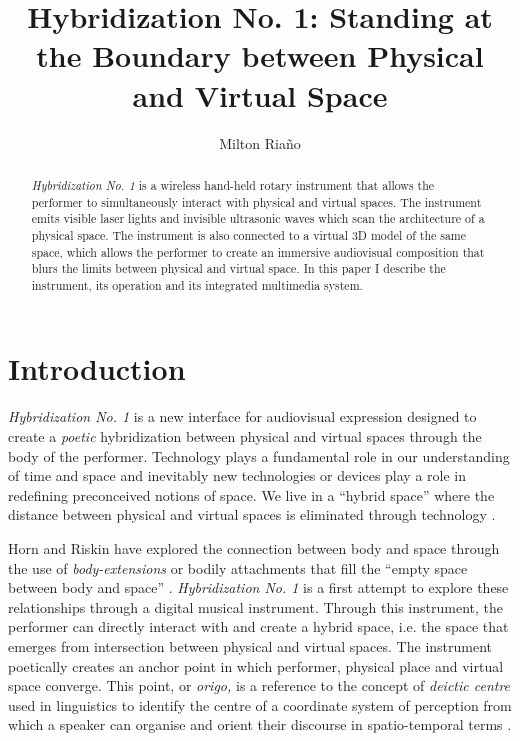 \documentclass[sigconf]{nimeart}
\begin{document}
\title[Hybridization No. 1: Standing at the Boundary between Physical and…]{Hybridization No. 1: Standing at the Boundary between Physical and Virtual Space}
\author{Milton Riaño}
\affiliation{\institution{}\country{}}
\renewcommand{\shortauthors}{Riaño}
\begin{abstract}
\emph{Hybridization No. 1} is a wireless hand-held rotary instrument that allows the performer to simultaneously interact with physical and virtual spaces. The instrument emits visible laser lights and invisible ultrasonic waves which scan the architecture of a physical space. The instrument is also connected to a virtual 3D model of the same space, which allows the performer to create an immersive audiovisual composition that blurs the limits between physical and virtual space. In this paper I describe the instrument, its operation and its integrated multimedia system.
\end{abstract}

\maketitle
\section{Introduction}\label{introduction}

\emph{Hybridization No. 1} is a new interface for audiovisual expression designed to create a \emph{poetic} hybridization between physical and virtual spaces through the body of the performer. Technology plays a fundamental role in our understanding of time and space and inevitably new technologies or devices play a role in redefining preconceived notions of space. We live in a ``hybrid space'' where the distance between physical and virtual spaces is eliminated through technology \cite{c1}.

Horn and Riskin have explored the connection between body and space through the use of \emph{body-extensions} or bodily attachments that fill the ``empty space between body and space'' \cite{c2,c3,c4}. \emph{Hybridization No. 1} is a first attempt to explore these relationships through a digital musical instrument. Through this instrument, the performer can directly interact with and create a hybrid space, i.e. the space that emerges from intersection between physical and virtual spaces. The instrument poetically creates an anchor point in which performer, physical place and virtual space converge. This point, or \emph{origo,} is a reference to the concept of \emph{deictic centre} used in linguistics to identify the centre of a coordinate system of perception from which a speaker can organise and orient their discourse in spatio-temporal terms \cite{c5}.
\end{document}
